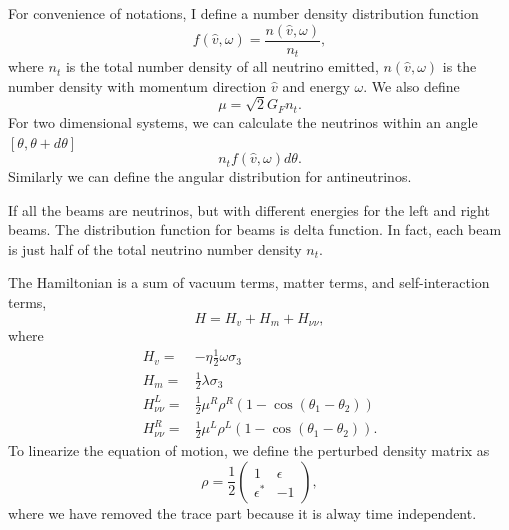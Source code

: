 For convenience of notations, I define a number density distribution function
\begin{equation}
   f(\hat v,\omega)= \frac{n(\hat v,\omega)}{n_t}, 
\end{equation}
where $n_t$ is the total number density of all neutrino emitted, $n(\hat v,\omega)$ is the number density with momentum direction $\hat v$ and energy $\omega$.
We also define
\begin{equation}
   \mu = \sqrt{2}G_F n_t. 
\end{equation}
For two dimensional systems, we can calculate the neutrinos within an angle $[\theta,\theta+d\theta]$
\begin{equation}
   n_t f(\hat v,\omega) d\theta. 
\end{equation}
Similarly we can define the angular distribution for antineutrinos.


If all the beams are neutrinos, but with different energies for the left and right beams. The distribution function for beams is delta function. In fact, each beam is just half of the total neutrino number density $n_t$.

The Hamiltonian is a sum of vacuum terms, matter terms, and self-interaction terms,
\begin{equation}
   H= H_v + H_m + H_{\nu\nu}, 
\end{equation}
where
\begin{align}
   H_v =& - \eta \frac{1}{2}\omega \sigma_3 \\
   H_m =& \frac{1}{2}\lambda \sigma_3\\
   H_{\nu\nu}^L =& \frac{1}{2}\mu^R \rho^R (1-\cos(\theta_1-\theta_2))\\
   H_{\nu\nu}^R =& \frac{1}{2}\mu^L \rho^L (1-\cos(\theta_1-\theta_2)).
\end{align}
To linearize the equation of motion, we define the perturbed density matrix as
\begin{equation}
   \rho = \frac{1}{2}\begin{pmatrix}
   1 & \epsilon\\
   \epsilon^* & -1
   \end{pmatrix},
\end{equation}
where we have removed the trace part because it is alway time independent.


